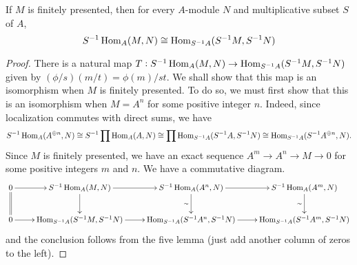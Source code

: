 \begin{proposition}
    If $M$ is finitely presented, then for every $A$-module $N$ and multiplicative subset $S$ of $A$, 
    \begin{equation*}
        S^{-1}\operatorname{Hom}_A(M,N)\cong\operatorname{Hom}_{S^{-1}A}(S^{-1}M,S^{-1}N)
    \end{equation*}
\end{proposition}
\begin{proof}
    There is a natural map $T:S^{-1}\operatorname{Hom}_A(M,N)\to\operatorname{Hom}_{S^{-1}A}(S^{-1}M,S^{-1}N)$ given by $(\phi/s)(m/t) = \phi(m)/st$. We shall show that this map is an isomorphism when $M$ is finitely presented. To do so, we must first show that this is an isomorphism when $M = A^n$ for some positive integer $n$. Indeed, since localization commutes with direct sums, we have 
    \begin{equation*}
        S^{-1}\operatorname{Hom}_A(A^{\oplus n}, N)\cong S^{-1}\prod\operatorname{Hom}_A(A,N)\cong\prod\operatorname{Hom}_{S^{-1}A}(S^{-1}A, S^{-1}N)\cong\operatorname{Hom}_{S^{-1}A}(S^{-1}A^{\oplus n}, N).
    \end{equation*}
    Since $M$ is finitely presented, we have an exact sequence $A^m\rightarrow A^n\rightarrow M\rightarrow 0$ for some positive integers $m$ and $n$. We have a commutative diagram. 
    \begin{equation*}
        \xymatrix{
            0\ar[r]\ar@{=}[d] & S^{-1}\Hom_A(M,N)\ar[r]\ar[d] & S^{-1}\Hom_A(A^n, N)\ar[r]\ar[d]_\sim & S^{-1}\Hom_A(A^m,N)\ar[d]_\sim\\
            0\ar[r] & \Hom_{S^{-1}A}(S^{-1}M,S^{-1}N)\ar[r] & \Hom_{S^{-1}A}(S^{-1}A^n, S^{-1}N)\ar[r] & \Hom_{S^{-1}A}(S^{-1}A^m,S^{-1}N)\\
        }
    \end{equation*}
    and the conclusion follows from the five lemma (just add another column of zeros to the left).
\end{proof}

